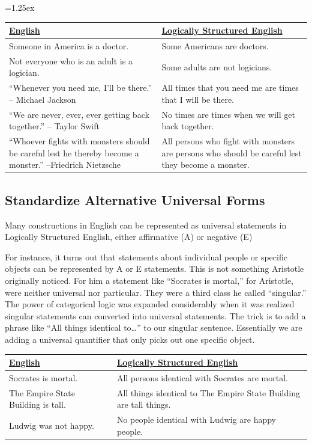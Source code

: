 \tabulinesep=1.25ex
\begin{longtabu}{p{.5\linewidth}p{.5\linewidth}}
\underline{English} &
\underline{Logically Structured English} \\
\endhead
Someone in America is a doctor. &
Some Americans are doctors. \\

Not everyone who is an adult is a logician. &
Some adults are not logicians. \\

``Whenever you need me, I'll be there.'' -- Michael Jackson &
All times that you need me are times that I will be there. \\

``We are never, ever, ever getting back together.'' -- Taylor Swift &
No times are times when we will get back together.\\

``Whoever fights with monsters should be careful lest he thereby become a monster.'' --Friedrich Nietzsche &
All persons who fight with monsters are persons who should be careful lest they become a monster.\\

\end{longtabu}

\subsection{Standardize Alternative Universal Forms}
\label{subsec:alternative_universals}

Many constructions in English can be represented as universal statements in Logically Structured English, either affirmative (A) or negative (E)

For instance, it turns out that statements about individual people or specific objects can be represented by A or E statements. This is not something Aristotle originally noticed. For him a statement like ``Socrates is mortal,'' for Aristotle, were neither universal nor particular. They were a third class he called ``singular.'' The power of categorical logic was expanded considerably when it was realized singular statements can converted into universal statements. The trick is to add a phrase like ``All things identical to\ldots'' to our singular sentence. Essentially we are adding a universal quantifier that only picks out one specific object.

\begin{longtabu}{p{.5\linewidth}p{.5\linewidth}}
\underline{English} &
\underline{Logically Structured English} \\
\endhead
Socrates is mortal.&
All persons identical with Socrates are mortal. \\

The Empire State Building is tall. &
All things identical to The Empire State Building are tall things. \\

Ludwig was not happy. &
No people identical with Ludwig are happy people. \\

\end{longtabu}



